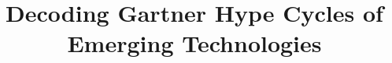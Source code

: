 \documentclass[xcolor=dvipsnames,compress,t,pdf,9pt]{beamer}
\title[\insertframenumber /\inserttotalframenumber]{Decoding Gartner Hype Cycles of Emerging Technologies}
\begin{document}
	\begin{frame}
	\titlepage
	\end{frame}

	
	
\end{document}
